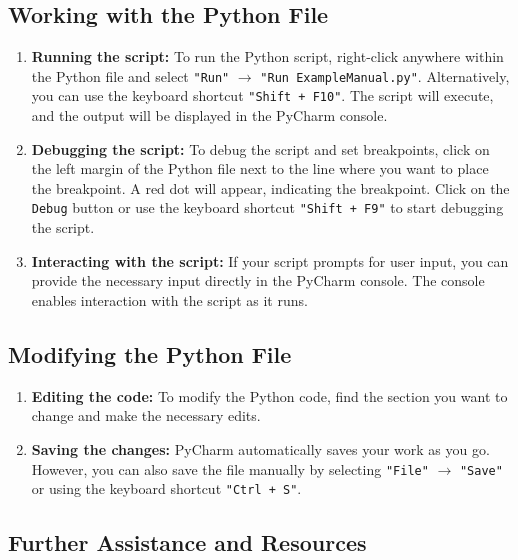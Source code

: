 \subsection*{Working with the Python File}

\begin{enumerate}
	
	\item \textbf{Running the script:} To run the Python script, right-click anywhere within the Python file and select \texttt{"Run"} $\rightarrow$ \texttt{"Run ExampleManual.py"}. Alternatively, you can use the keyboard shortcut \texttt{"Shift + F10"}. The script will execute, and the output will be displayed in the PyCharm console.
	
	\item \textbf{Debugging the script:} To debug the script and set breakpoints, click on the left margin of the Python file next to the line where you want to place the breakpoint. A red dot will appear, indicating the breakpoint. Click on the \texttt{Debug} button or use the keyboard shortcut \texttt{"Shift + F9"} to start debugging the script.
	
	\item \textbf{Interacting with the script:} If your script prompts for user input, you can provide the necessary input directly in the PyCharm console. The console enables interaction with the script as it runs.
	
\end{enumerate}

\subsection*{Modifying the Python File}

\begin{enumerate}
	
	\item \textbf{Editing the code:} To modify the Python code, find the section you want to change and make the necessary edits.
	
	\item \textbf{Saving the changes:} PyCharm automatically saves your work as you go. However, you can also save the file manually by selecting \texttt{"File"} $\rightarrow$ \texttt{"Save"} or using the keyboard shortcut \texttt{"Ctrl + S"}.
	
\end{enumerate}

\subsection*{Further Assistance and Resources}

